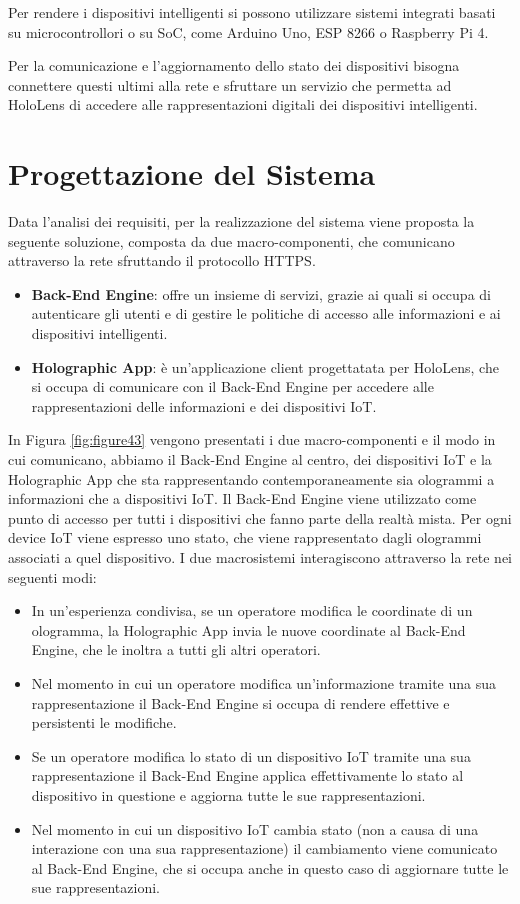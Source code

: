 Per rendere i dispositivi intelligenti si possono utilizzare sistemi integrati basati su microcontrollori o su SoC, come Arduino Uno, ESP 8266 o Raspberry Pi 4.

Per la comunicazione e l'aggiornamento dello stato dei dispositivi bisogna connettere questi ultimi alla rete e sfruttare un servizio che permetta ad HoloLens di accedere alle rappresentazioni digitali dei dispositivi intelligenti.

\section{Progettazione del Sistema}\label{sec:Sezione4.3}
Data l'analisi dei requisiti, per la realizzazione del sistema viene proposta la seguente soluzione, composta da due macro-componenti, che comunicano attraverso la rete sfruttando il protocollo HTTPS.

\begin{itemize}
    \item \textbf{Back-End Engine}: offre un insieme di servizi, grazie ai quali si occupa di autenticare gli utenti e di gestire le politiche di accesso alle informazioni e ai dispositivi intelligenti.
    \item \textbf{Holographic App}: è un'applicazione client progettatata per HoloLens, che si occupa di comunicare con il Back-End Engine per accedere alle rappresentazioni delle informazioni e dei dispositivi IoT.
\end{itemize}

In Figura \ref{fig:figure43} vengono presentati i due macro-componenti e il modo in cui comunicano, abbiamo il Back-End Engine al centro, dei dispositivi IoT e la Holographic App che sta rappresentando contemporaneamente sia ologrammi a informazioni che a dispositivi IoT.
Il Back-End Engine viene utilizzato come punto di accesso per tutti i dispositivi che fanno parte della realtà mista.
Per ogni device IoT viene espresso uno stato, che viene rappresentato dagli ologrammi associati a quel dispositivo.
I due macrosistemi interagiscono attraverso la rete nei seguenti modi:
\begin{itemize}
    \item In un'esperienza condivisa, se un operatore modifica le coordinate di un ologramma, la Holographic App invia le nuove coordinate al Back-End Engine, che le inoltra a tutti gli altri operatori.
    \item Nel momento in cui un operatore modifica un'informazione tramite una sua rappresentazione il Back-End Engine si occupa di rendere effettive e persistenti le modifiche.
    \item Se un operatore modifica lo stato di un dispositivo IoT tramite una sua rappresentazione il Back-End Engine applica effettivamente lo stato al dispositivo in questione e aggiorna tutte le sue rappresentazioni.
    \item Nel momento in cui un dispositivo IoT cambia stato (non a causa di una interazione con una sua rappresentazione) il cambiamento viene comunicato al Back-End Engine, che si occupa anche in questo caso di aggiornare tutte le sue rappresentazioni. 
\end{itemize}

